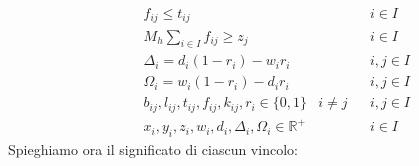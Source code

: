 \begin{align}
	  &             &   & f_{ij} \leq t_{ij}                                                           &          &   & i \in I \label{equa67}   \\
	  &             &   & M_h \sum_{i \in I} f_{ij} \geq z_j                                           &          &   & i \in I \label{equa68}   \\
	  &             &   & \Delta_i = d_i (1 - r_i) - w_i r_i                                           &          &   & i,j \in I \label{equa69} \\
	  &             &   & \Omega_i = w_i (1 - r_i) - d_i r_i                                           &          &   & i,j \in I \label{equa70} \\  
	  &             &   & b_{ij}, l_{ij}, t_{ij}, f_{ij}, k_{ij}, r_i \in \{0,1\}                      & i \neq j &   & i,j \in I \label{equa71} \\
	  &             &   & x_{i}, y_{i}, z_{i}, w_{i}, d_{i}, \Delta_{i}, \Omega_{i} \in \mathbb{R}^{+} &          &   & i \in I  \label{equa72}
\end{align}
\newpage
Spieghiamo ora il significato di ciascun vincolo:
